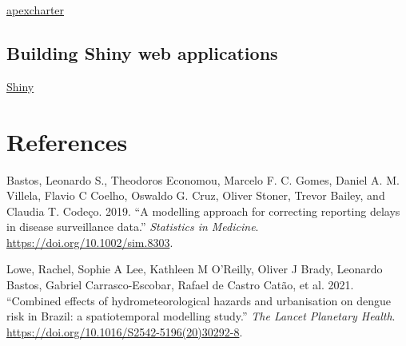 \documentclass[
  letterpaper,
  DIV=11,
  numbers=noendperiod]{scrreprt}
\newlength{\cslhangindent}
\newlength{\cslentryspacingunit} %
\newenvironment{CSLReferences}[2] %
 {%
  \setlength{\parindent}{0pt}
  \ifodd #1
  \let\oldpar\par
  \def\par{\hangindent=\cslhangindent\oldpar}
  \fi
  \setlength{\parskip}{#2\cslentryspacingunit}
 }%
 {}
\begin{document}
\href{https://dreamrs.github.io/apexcharter/}{apexcharter}

\hypertarget{building-shiny-web-applications}{%
\section{Building Shiny web
applications}\label{building-shiny-web-applications}}

\href{https://shiny.posit.co/}{Shiny}


\hypertarget{references}{%
\chapter*{References}\label{references}}


\hypertarget{refs}{}
\begin{CSLReferences}{1}{0}
\leavevmode{}%
Bastos, Leonardo S., Theodoros Economou, Marcelo F. C. Gomes, Daniel A.
M. Villela, Flavio C Coelho, Oswaldo G. Cruz, Oliver Stoner, Trevor
Bailey, and Claudia T. Codeço. 2019. {``{A modelling approach for
correcting reporting delays in disease surveillance data}.''}
\emph{{Statistics in Medicine}}. \url{https://doi.org/10.1002/sim.8303}.

\leavevmode{}%
Lowe, Rachel, Sophie A Lee, Kathleen M O'Reilly, Oliver J Brady,
Leonardo Bastos, Gabriel Carrasco-Escobar, Rafael de Castro Catão, et
al. 2021. {``{Combined effects of hydrometeorological hazards and
urbanisation on dengue risk in Brazil: a spatiotemporal modelling
study}.''} \emph{{The Lancet Planetary Health}}.
\url{https://doi.org/10.1016/S2542-5196(20)30292-8}.

\end{CSLReferences}
\end{document}
